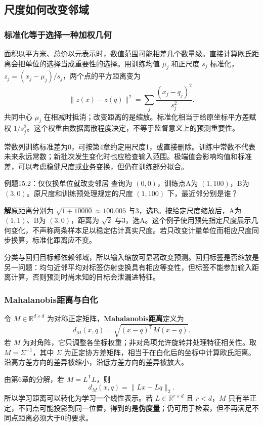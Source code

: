 \documentclass[UTF8,fontset=none,zihao=-4,a4paper]{ctexart}
\newcommand{\term}[1]{\textbf{#1}}
\newcommand{\sol}{\par\noindent\textbf{解}\quad}
\numberwithin{equation}{section}
\numberwithin{figure}{section}
\begin{document}
\subsection{尺度如何改变邻域}
\subsubsection{标准化等于选择一种加权几何}
面积以平方米、总价以元表示时，数值范围可能相差几个数量级。直接计算欧氏距离会把单位的选择当成重要性的选择。用训练均值 $\mu_j$ 和正尺度 $s_j$ 标准化，$z_j=(x_j-\mu_j)/s_j$，两个点的平方距离变为
\[
 \|z(x)-z(q)\|^2=\sum_j\frac{(x_j-q_j)^2}{s_j^2}.
\]
共同中心 $\mu_j$ 在相减时抵消；改变距离的是缩放。标准化相当于给原坐标平方差赋权 $1/s_j^2$。这个权重由数据离散程度决定，不等于监督意义上的预测重要性。

常数列训练标准差为0，可按第4章约定用尺度1，或直接删除。训练中常数不代表未来永远常数；新批次发生变化时也应检查输入范围。极端值会影响均值和标准差，可以考虑稳健尺度或业务变换，但仍在训练部分拟合。

\begin{infobox}[unbreakable]{例题15.2：仅仅换单位就改变邻居}
查询为 $(0,0)$，训练点A为 $(1,100)$，B为 $(3,0)$。原尺度和训练预处理规定的尺度 $(1,100)$ 下，最近邻分别是谁？
\sol 原距离分别为 $\sqrt{1+10000}\approx100.005$ 与3，选B。按给定尺度缩放后，A为 $(1,1)$、B为 $(3,0)$，距离为 $\sqrt2$ 与3，选A。这个例子使用预先指定尺度展示几何变化，不声称两条样本足以稳定估计真实尺度。若只改变计量单位而相应尺度同步换算，标准化距离应不变。
\end{infobox}
分类与回归目标都依赖邻域，所以输入缩放可显著改变预测。回归标签是否缩放是另一问题：均匀近邻平均对标签仿射变换具有相应等变性，但标签不能参加输入距离计算，否则预测时尚未知的目标会泄漏进特征。

\subsubsection{Mahalanobis距离与白化}
令 $M\in\mathbb R^{d\times d}$ 为对称正定矩阵，\term{Mahalanobis距离}定义为
\[
 d_M(x,q)=\sqrt{(x-q)^{\mathsf T}M(x-q)}.
\]
若 $M$ 为对角阵，它只调整各坐标权重；非对角项允许旋转并处理特征相关性。取 $M=\Sigma^{-1}$，其中 $\Sigma$ 为正定协方差矩阵，相当于在白化后的坐标中计算欧氏距离。沿高方差方向的差异被缩小，沿低方差方向的差异被放大。

由第6章的分解，若 $M=L^{\mathsf T}L$，则
\[
 d_M(x,q)=\|Lx-Lq\|_2.
\]
所以学习距离可以转化为学习一个线性表示。若 $L\in\mathbb R^{r\times d}$ 且 $r<d$，$M$ 只有半正定，不同点可能投影到同一位置，得到的是\term{伪度量}；仍可用于检索，但不再满足不同点距离必须大于0的要求。
\end{document}
